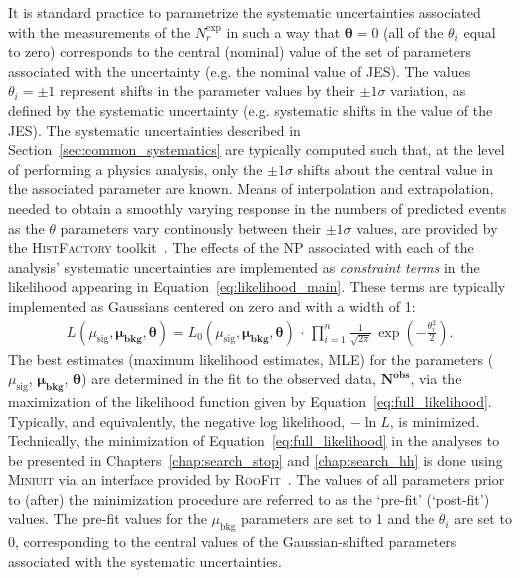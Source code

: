 {\color{red}{REORDER THIS TEXT}} It is standard practice to parametrize the systematic uncertainties associated with the measurements
of the $N_r^{\text{exp}}$ in such a way that $\bm{\theta} = 0$ (all of the $\theta_i$ equal to zero) corresponds to the central (nominal) value
of the set of parameters associated with the uncertainty (e.g. the nominal value of JES).
The values $\theta_i = \pm 1$ represent shifts in the parameter values by their $\pm 1\sigma$
variation, as defined by the systematic uncertainty (e.g. systematic shifts in the value of the JES).
The systematic uncertainties described in Section~\ref{sec:common_systematics} are typically
computed such that, at the level of performing a physics analysis, only the $\pm 1 \sigma$ shifts about the central value
in the associated parameter are known.
Means of interpolation and extrapolation, needed to obtain a smoothly varying response in the
numbers of predicted events as the $\theta$ parameters vary continously between their $\pm 1 \sigma$ values,
are provided by the \textsc{HistFactory} toolkit~\cite{HistFactory}.
The effects of the NP associated with each of the analysis' systematic uncertainties
are implemented as \textit{constraint terms} in the likelihood appearing in Equation~\ref{eq:likelihood_main}.
These terms are typically implemented as Gaussians centered on zero and with a width of 1:
\begin{align}
    L(\mu_{\text{sig}}, \bm{\mu_{\text{bkg}}}, \bm{\theta}) = L_0(\mu_{\text{sig}}, \bm{\mu_{\text{bkg}}}, \bm{\theta})
        \, \cdot \, \prod\limits_{i = 1}^{n} \frac{1}{\sqrt{2 \pi}} \, \exp \left( - \frac{\theta_i^2}{2} \right).
    \label{eq:full_likelihood}
\end{align}
The best estimates (maximum likelihood estimates, MLE) for the parameters ($\mu_{\text{sig}}$, $\bm{\mu_{\text{bkg}}}$, $\bm{\theta}$)
are determined in the fit to the observed data, $\bm{N^{\text{obs}}}$, via the maximization
of the likelihood function given by Equation~\ref{eq:full_likelihood}. 
Typically, and equivalently, the negative log likelihood, $-\ln L$, is minimized.
Technically, the minimization of Equation~\ref{eq:full_likelihood} in the analyses to be presented
in Chapters~\ref{chap:search_stop} and \ref{chap:search_hh} is done using \textsc{Miniuit}
via an interface provided by \textsc{RooFit}~\cite{MINUIT,RooFitI}.
The values of all parameters prior to (after) the minimization procedure are referred to as the
`pre-fit' (`post-fit') values.
The pre-fit values for the $\mu_{\text{bkg}}$ parameters are set to 1 and the $\theta_i$ are set to $0$, corresponding
to the central values of the Gaussian-shifted parameters associated with the systematic uncertainties.

